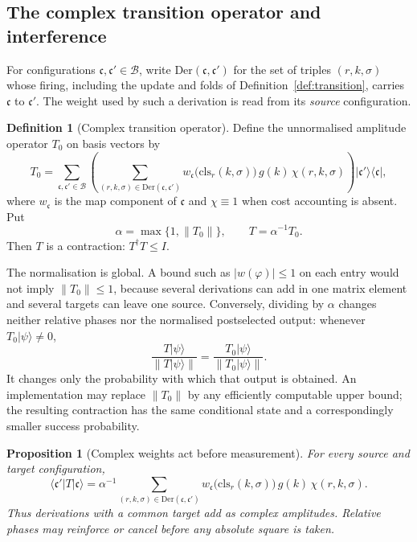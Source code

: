 \documentclass[11pt,a4paper]{article}
\theoremstyle{plain}
\newtheorem{proposition}[theorem]{Proposition}
\theoremstyle{definition}
\newtheorem{definition}[theorem]{Definition}
\theoremstyle{remark}
\newcommand{\wmap}{w}
\newcommand{\gfac}{g}
\newcommand{\class}{\mathrm{cls}}
\begin{document}
\subsection{The complex transition operator and interference}
\label{sec:interference}

For configurations $\mathfrak{c},\mathfrak{c}'\in\mathcal{B}$, write
$\mathrm{Der}(\mathfrak{c},\mathfrak{c}')$ for the set of triples $(r,k,\sigma)$ whose firing, including
the update and folds of Definition~\ref{def:transition}, carries $\mathfrak{c}$ to
$\mathfrak{c}'$. The weight used by such a derivation is read from its \emph{source} configuration.

\begin{definition}[Complex transition operator]
\label{def:transition-operator}
Define the unnormalised amplitude operator $T_0$ on basis vectors by
\[
T_0
 =
\sum_{\mathfrak{c},\mathfrak{c}'\in\mathcal{B}}
\left(
  \sum_{(r,k,\sigma)\in\mathrm{Der}(\mathfrak{c},\mathfrak{c}')}
  \wmap_{\mathfrak{c}}\!\big(\class_r(k,\sigma)\big)\,
  \gfac(k)\,\chi(r,k,\sigma)
\right)
|\mathfrak{c}'\rangle\langle\mathfrak{c}|,
\]
where $\wmap_{\mathfrak{c}}$ is the map component of $\mathfrak{c}$ and $\chi\equiv 1$ when cost
accounting is absent. Put
\[
\alpha=\max\{1,\|T_0\|\},
\qquad
T=\alpha^{-1}T_0.
\]
Then $T$ is a contraction: $T^\dagger T\leq I$.
\end{definition}

The normalisation is global. A bound such as $|\wmap(\varphi)|\leq 1$ on each entry would not imply
$\|T_0\|\leq 1$, because several derivations can add in one matrix element and several targets can
leave one source. Conversely, dividing by $\alpha$ changes neither relative phases nor the
normalised postselected output: whenever $T_0|\psi\rangle\neq 0$,
\[
\frac{T|\psi\rangle}{\|T|\psi\rangle\|}
 =
\frac{T_0|\psi\rangle}{\|T_0|\psi\rangle\|}.
\]
It changes only the probability with which that output is obtained. An implementation may replace
$\|T_0\|$ by any efficiently computable upper bound; the resulting contraction has the same
conditional state and a correspondingly smaller success probability.

\begin{proposition}[Complex weights act before measurement]
\label{prop:interference}
For every source and target configuration,
\[
\langle\mathfrak{c}'|T|\mathfrak{c}\rangle
 =
\alpha^{-1}
\sum_{(r,k,\sigma)\in\mathrm{Der}(\mathfrak{c},\mathfrak{c}')}
\wmap_{\mathfrak{c}}\!\big(\class_r(k,\sigma)\big)\,
\gfac(k)\,\chi(r,k,\sigma).
\]
Thus derivations with a common target add as complex amplitudes. Relative phases may reinforce or
cancel before any absolute square is taken.
\end{proposition}
\end{document}
